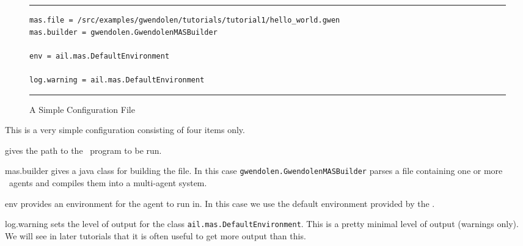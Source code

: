 \begin{figure}[htb]
\noindent\rule{\textwidth}{1pt}
\begin{verbatim}
mas.file = /src/examples/gwendolen/tutorials/tutorial1/hello_world.gwen
mas.builder = gwendolen.GwendolenMASBuilder

env = ail.mas.DefaultEnvironment

log.warning = ail.mas.DefaultEnvironment
\end{verbatim}
\rule{\textwidth}{1pt}
\caption{A Simple Configuration File}
\label{fig:gwen_config}
\end{figure}

This is a very simple configuration consisting of four items only.
\begin{description}
\item[mas.file] gives the path to the \gwendolen\ program to be run.
\begin{sloppypar}
\item[mas.builder] gives a java class for building
  the file.  In this case
  \texttt{gwendolen.GwendolenMASBuilder} parses a file containing one or more \gwendolen\ agents
  and compiles them into a multi-agent system.
\item[env] provides an environment for the agent to
  run in.  In this case we use the default
  environment provided by the \ail.
\item[log.warning] sets the level of output for the
  class \texttt{ail.mas.DefaultEnvironment}.  This is a pretty minimal
  level of output (warnings only).  We will see in later tutorials
  that it is often useful to get more output than this.
\end{sloppypar}
\end{description}

